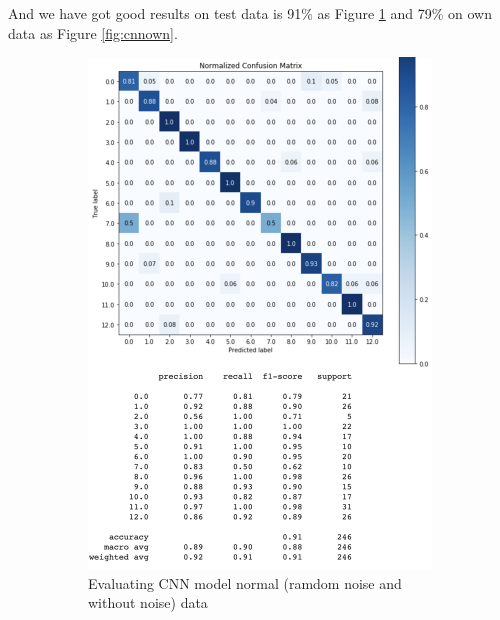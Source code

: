 \documentclass[%
  article,%
  10pt,%
  a4paper,%
  fleqn,%
  oneside,%
  sumario = tradicional,%
  chapter = TITLE,%
  section = TITLE,%
]{abntex2}
\begin{document}
And we have got good results on test data is 91\% as Figure \ref{fig:cnnall} and 79\% on own data as Figure \ref{fig:cnnown}.

\begin{figure}
\centering
\begin{minipage}[b]{.4\textwidth}
\begin{figure}[H]
  \centering
  \includegraphics[width = \columnwidth]{./Figuras/cnnall}
  \caption{Evaluating CNN model normal (ramdom noise and without noise) data}
  \label{fig:cnnall}
\end{figure}
\end{minipage}\qquad
\begin{minipage}[b]{.4\textwidth}
\begin{figure}[H]
  \centering

\end{figure}
\end{minipage}
\end{figure}
\end{document}
